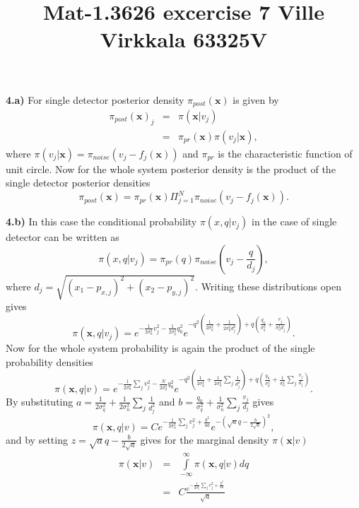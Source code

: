 \documentclass[12pt]{article}
\begin{document}
\title{Mat-1.3626 excercise 7 Ville Virkkala 63325V}

\vspace{\baselineskip}

\textbf{4.a)} For single detector posterior density $\pi _{post}(\mathbf{x})$ is given by
\begin{eqnarray}
   \pi_{post}(\mathbf{x})_j &=& \pi (\mathbf{x}|v_j) \nonumber \\
  &=& \pi_{pr}(\mathbf{x})\pi(v_j|\mathbf{x}),
\end{eqnarray}
where $\pi(v_j|\mathbf{x})=\pi_{noise}(v_j-f_j(\mathbf{x}))$ and $\pi_{pr}$  is the characteristic function of unit circle.
Now for the whole system posterior density is the product of the single detector posterior densities
\begin{equation}
  \pi_{post}(\mathbf{x})=\pi_{pr}(\mathbf{x})\Pi_{j=1}^N\pi_{noise}(v_j-f_j(\mathbf{x})).
\end{equation}  

\textbf{4.b)} In this case the conditional probability $\pi(x,q|v_j)$ in the case of single detector can be written as
\begin{equation}
  \pi(x,q|v_j)=\pi_{pr}(q)\pi_{noise}(v_j-\frac{q}{d_j}),
\end{equation}
where $d_j=\sqrt{(x_1-p_{x,j})^2+(x_2-p_{y,j})^2}$. Writing these distributions open gives
\begin{equation}
  \pi(\mathbf{x},q|v_j)=e^{-\frac{1}{2\sigma_n^2}v_j^2-\frac{1}{2\sigma_q^2}q_0^2}e^{-q^2(\frac{1}{2\sigma_q^2}+\frac{1}{2\sigma_n^2d_j^2})+q(\frac{q_0}{\sigma_q^2}+\frac{v_j}{\sigma_n^2d_j})}.
\end{equation}
Now for the whole system probability is again the product of the single probability densities
\begin{equation}
\pi(\mathbf{x},q|v)=e^{-\frac{1}{2\sigma_n^2}\sum_jv_j^2-\frac{N}{2\sigma_q^2}q_0^2}e^{-q^2(\frac{1}{2\sigma_q^2}+\frac{1}{2\sigma_n^2}\sum_j\frac{1}{d_j^2})+q(\frac{q_0}{\sigma_q^2}+\frac{1}{\sigma_n^2}\sum_j\frac{v_j}{d_j})}.
\end{equation}
By substituting $a=\frac{1}{2\sigma_q^2}+\frac{1}{2\sigma_n^2}\sum_j\frac{1}{d_j^2}$ and $b=\frac{q_0}{\sigma_q^2}+\frac{1}{\sigma_n^2}\sum_j\frac{v_j}{d_j}$ gives
\begin{equation}
  \pi(\mathbf{x},q|v)=Ce^{-\frac{1}{2\sigma_n^2}\sum_jv_j^2+\frac{b^2}{4a}}e^{-(\sqrt{a}q-\frac{b}{2\sqrt{a}})^2},
\end{equation}
and by setting $z=\sqrt{a}q-\frac{b}{2\sqrt{a}}$ gives for the marginal density $\pi(\mathbf{x}|v)$
\begin{eqnarray}
  \pi(\mathbf{x}|v) &=&\int\limits_{-\infty}^{\infty}\pi(\mathbf{x},q|v)dq \nonumber\\
  &=&C\frac{e^{-\frac{1}{2\sigma_n^2}\sum_jv_j^2+\frac{b^2}{4a}}}{\sqrt{a}}
\end{eqnarray} 
\end{document}
